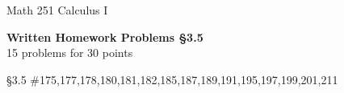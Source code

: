 \documentclass[11pt]{report}
\theoremstyle{plain}
\begin{document}
\hfill Math 251 Calculus I
\begin{center}
\Large{\textbf{Written Homework Problems \S 3.5}} \\
15 problems for 30 points\\
\end{center}

\begin{description}
\item{\S 3.5} \#175,177,178,180,181,182,185,187,189,191,195,197,199,201,211

\end{description}
\end{document}
